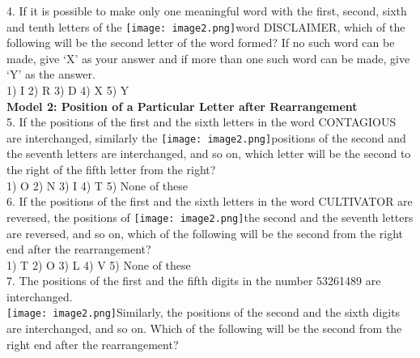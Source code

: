 \documentclass[
]{article}
\begin{document}
4. If it is possible to make only one meaningful word with the first, second, sixth and tenth
letters of the \texttt{[image: image2.png]}word DISCLAIMER, which of the following will be the second letter of the
word formed? If no such word can be made, give ‘X’ as your answer and if more than one
such word can be made, give ‘Y’ as the answer.\\
1) I \hspace{2mm}2) R \hspace{2mm}3) D \hspace{2mm}4) X \hspace{2mm}5) Y\\

\textbf{Model 2: Position of a Particular Letter after Rearrangement}\\

5. If the positions of the first and the sixth letters in the word CONTAGIOUS are interchanged,
similarly the \texttt{[image: image2.png]}positions of the second and the seventh letters are interchanged, and so on,
which letter will be the second to the right of the fifth letter from the right?\\
1) O \hspace{2mm}2) N \hspace{2mm}3) I \hspace{2mm}4) T \hspace{2mm}5) None of these\\

6. If the positions of the first and the sixth letters in the word CULTIVATOR are reversed, the
positions of \texttt{[image: image2.png]}the second and the seventh letters are reversed, and so on, which of the
following will be the second from the right end after the rearrangement?\\
1) T \hspace{2mm}2) O \hspace{2mm}3) L \hspace{2mm}4) V \hspace{2mm}5) None of these\\

7. The positions of the first and the fifth digits in the number 53261489 are interchanged.\\
\texttt{[image: image2.png]}Similarly, the positions of the second and the sixth digits are interchanged, and so on. Which
of the following will be the second from the right end after the rearrangement?
\end{document}
